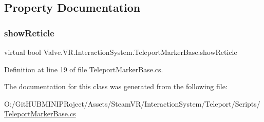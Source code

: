 \subsection{Property Documentation}
\mbox{\label{class_valve_1_1_v_r_1_1_interaction_system_1_1_teleport_marker_base_adc6c72ef843ea02dc026952098163f80}} 
\subsubsection{\texorpdfstring{showReticle}{showReticle}}
{\footnotesize\ttfamily virtual bool Valve.\+V\+R.\+Interaction\+System.\+Teleport\+Marker\+Base.\+show\+Reticle\hspace{0.3cm}{\ttfamily [get]}}



Definition at line 19 of file Teleport\+Marker\+Base.\+cs.



The documentation for this class was generated from the following file\+:\begin{DoxyCompactItemize}
\item 
O\+:/\+Git\+H\+U\+B\+M\+I\+N\+I\+P\+Roject/\+Assets/\+Steam\+V\+R/\+Interaction\+System/\+Teleport/\+Scripts/\mbox{\hyperlink{_teleport_marker_base_8cs}{Teleport\+Marker\+Base.\+cs}}\end{DoxyCompactItemize}

